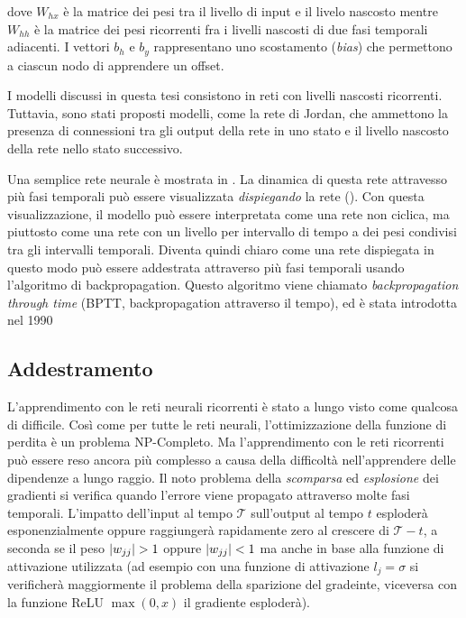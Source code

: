 dove $W_{hx}$ \`e la matrice dei pesi tra il livello di input e il livelo nascosto mentre $W_{hh}$ \`e la matrice dei pesi ricorrenti fra i livelli nascosti di due fasi temporali adiacenti.
I vettori $b_h$ e $b_y$ rappresentano uno scostamento (\emph{bias}) che permettono a ciascun nodo di apprendere un offset.

I modelli discussi in questa tesi consistono in reti con livelli nascosti ricorrenti.
Tuttavia, sono stati proposti modelli, come la rete di Jordan, che ammettono la presenza di connessioni tra gli output della rete in uno stato e il livello nascosto della rete nello stato successivo.

Una semplice rete neurale \`e mostrata in . %
La dinamica di questa rete attravesso pi\`u fasi temporali pu\`o essere visualizzata \emph{dispiegando} la rete (). %
Con questa visualizzazione, il modello pu\`o essere interpretata come una rete non ciclica, ma piuttosto come una rete con un livello per intervallo di tempo a dei pesi condivisi tra gli intervalli temporali.
Diventa quindi chiaro come una rete dispiegata in questo modo pu\`o essere addestrata attraverso pi\`u fasi temporali usando l'algoritmo di backpropagation.
Questo algoritmo viene chiamato \emph{backpropagation through time} (BPTT, backpropagation attraverso il tempo), ed \`e stata introdotta nel 1990~\cite{Werbos:1990}

\subsection{Addestramento}
L'apprendimento con le reti neurali ricorrenti \`e stato a lungo visto come qualcosa di difficile.
Cos\`i come per tutte le reti neurali, l'ottimizzazione della funzione di perdita \`e un problema NP-Completo.
Ma l'apprendimento con le reti ricorrenti pu\`o essere reso ancora pi\`u complesso a causa della difficolt\`a nell'apprendere delle dipendenze a lungo raggio.
Il noto problema della \emph{scomparsa} ed \emph{esplosione} dei gradienti si verifica quando l'errore viene propagato attraverso molte fasi temporali.
 L'impatto dell'input al tempo $\mathcal{T}$ sull'output al tempo $t$ esploder\`a esponenzialmente oppure raggiunger\`a rapidamente zero al crescere di $\mathcal{T} - t$, a seconda se il peso $\lvert w_{jj}\rvert>1$ oppure $\lvert w_{jj}\rvert<1$ ma anche in base alla funzione di attivazione utilizzata %
(ad esempio con una funzione di attivazione $l_j = \sigma$ si verificher\`a maggiormente il problema della sparizione del gradeinte, viceversa con la funzione ReLU $\operatorname{max}(0, x)$ il gradiente esploder\`a).

